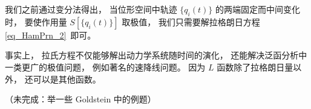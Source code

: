 
\begin{issues}
\issueDraft
\end{issues}


我们之前通过变分法得出， 当位形空间中轨迹 $\{q_i(t)\}$ 的两端固定而中间变化时， 要使作用量 $S[\{q_i(t)\}]$ 取极值， 我们只需要解拉格朗日方程\autoref{eq_HamPrn_2}~即可。

事实上， 拉氏方程不仅能够解出动力学系统随时间的演化， 还能解决泛函分析中一类更广的极值问题， 例如著名的速降线问题。 因为 $L$ 函数除了拉格朗日量以外， 还可以是其他函数。

（未完成：举一些 Goldstein 中的例题）
